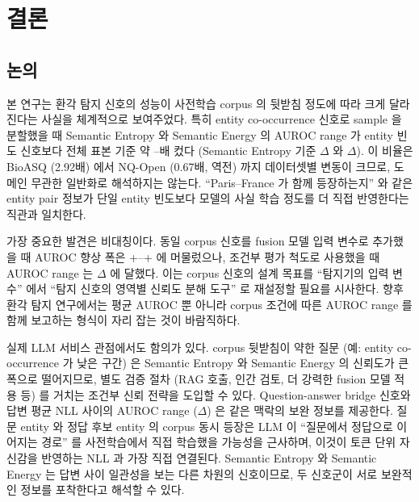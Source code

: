 \documentclass[oneside,ko,under]{snuthesis}
\begin{document}
\chapter{결론}{\label{ch:conclusion}}

\section{논의}

본 연구는 환각 탐지 신호의 성능이 사전학습 corpus 의 뒷받침 정도에 따라 크게 달라진다는 사실을 체계적으로 보여주었다. 특히 entity co-occurrence 신호로 sample 을 분할했을 때 Semantic Entropy 와 Semantic Energy 의 AUROC range 가 entity 빈도 신호보다 전체 표본 기준 약 \HeadlineRatioRangeLow{}--\HeadlineRatioRangeHigh{}배 컸다 (Semantic Entropy 기준 $\Delta$\HeadlineEntityPairSEDelta{} 와 $\Delta$\HeadlineEntityFreqSEDelta{}). 이 비율은 BioASQ (2.92배) 에서 NQ-Open (0.67배, 역전) 까지 데이터셋별 변동이 크므로, 도메인 무관한 일반화로 해석하지는 않는다. ``Paris--France 가 함께 등장하는지'' 와 같은 entity pair 정보가 단일 entity 빈도보다 모델의 사실 학습 정도를 더 직접 반영한다는 직관과 일치한다.

가장 중요한 발견은 비대칭이다. 동일 corpus 신호를 fusion 모델 입력 변수로 추가했을 때 AUROC 향상 폭은 +\HeadlineCorpusLiftGBM{}--+\HeadlineCorpusLiftRF{} 에 머물렀으나, 조건부 평가 척도로 사용했을 때 AUROC range 는 $\Delta$\HeadlineEntityPairSEDelta{} 에 달했다. 이는 corpus 신호의 설계 목표를 ``탐지기의 입력 변수'' 에서 ``탐지 신호의 영역별 신뢰도 분해 도구'' 로 재설정할 필요를 시사한다. 향후 환각 탐지 연구에서는 평균 AUROC 뿐 아니라 corpus 조건에 따른 AUROC range 를 함께 보고하는 형식이 자리 잡는 것이 바람직하다.

실제 LLM 서비스 관점에서도 함의가 있다. corpus 뒷받침이 약한 질문 (예: entity co-occurrence 가 낮은 구간) 은 Semantic Entropy 와 Semantic Energy 의 신뢰도가 큰 폭으로 떨어지므로, 별도 검증 절차 (RAG 호출, 인간 검토, 더 강력한 fusion 모델 적용 등) 를 거치는 조건부 신뢰 전략을 도입할 수 있다. Question-answer bridge 신호와 답변 평균 NLL 사이의 AUROC range ($\Delta$\HeadlineQaBridgeNllDelta{}) 은 같은 맥락의 보완 정보를 제공한다. 질문 entity 와 정답 후보 entity 의 corpus 동시 등장은 LLM 이 ``질문에서 정답으로 이어지는 경로'' 를 사전학습에서 직접 학습했을 가능성을 근사하며, 이것이 토큰 단위 자신감을 반영하는 NLL 과 가장 직접 연결된다. Semantic Entropy 와 Semantic Energy 는 답변 사이 일관성을 보는 다른 차원의 신호이므로, 두 신호군이 서로 보완적인 정보를 포착한다고 해석할 수 있다.
\end{document}
